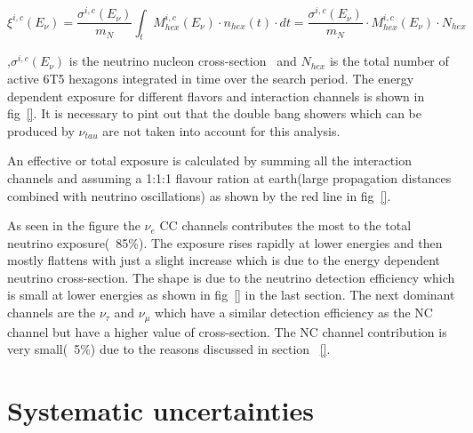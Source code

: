 \begin{equation}
  \xi^{i,c}(E_{\nu}) = \frac{\sigma^{i,c}(E_{\nu})}{m_N} \int_{t} M_{hex}^{i,c}(E_{\nu}) \cdot n_{hex}(t) \cdot dt =  \frac{\sigma^{i,c}(E_{\nu})}{m_N} \cdot M_{hex}^{i,c}(E_{\nu}) \cdot N_{hex}
\end{equation}

,$\sigma^{i,c}(E_{\nu})$ is the neutrino nucleon cross-section~\cite{} and $N_{hex}$ is the total number of active 6T5 hexagons integrated in time over the search period. The energy dependent exposure for different flavors and interaction channels is shown in fig~\ref{}. It is necessary to pint out that the double bang showers which can be produced by $\nu_{tau}$ are not taken into account for this analysis. 

An effective or total exposure is calculated by summing all the interaction channels and assuming a 1:1:1 flavour ration at earth(large propagation distances combined with neutrino oscillations) as shown by the red line in fig~\ref{}. 

As seen in the figure the $\nu_e$ CC channels contributes the most to the total neutrino exposure(~85\%). The exposure rises rapidly at lower energies and then mostly flattens with just a slight increase which is due to the energy dependent neutrino cross-section. The shape is due to the neutrino detection efficiency which is small at lower energies as shown in fig~\ref{} in the last section. The next dominant channels are the $\nu_{\tau}$ and $\nu_{\mu}$ which have a similar detection efficiency as the NC channel but have a higher value of cross-section. The NC channel contribution is very small(~5\%) due to the reasons discussed in section ~\ref{}.  

\section{Systematic uncertainties}
\label{sec:det_uncert}




